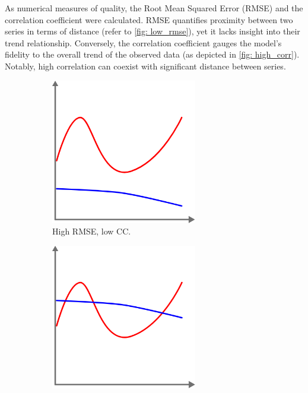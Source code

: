 As numerical measures of quality, the Root Mean Squared Error (RMSE) and the correlation coefficient were calculated.
RMSE quantifies proximity between two series in terms of distance (refer to \autoref*{fig: low_rmse}), yet it lacks insight into their trend relationship.
Conversely, the correlation coefficient gauges the model's fidelity to the overall trend of the observed data (as depicted in \autoref*{fig: high_corr}).
Notably, high correlation can coexist with significant distance between series.

\begin{figure}
    \centering
    \begin{subfigure}{0.3\textwidth}
        \centering
        \includegraphics[width=0.7\textwidth]{resources/images/high_rmse_low_corr.png}
        \caption{High RMSE, low CC.}
        \label{fig: high_rmse_low_corr}
    \end{subfigure}
    \hspace{1.5cm}
    \begin{subfigure}{0.3\textwidth}
        \centering
        \includegraphics[width=0.7\textwidth]{resources/images/low_rmse.png}

\end{subfigure}
\end{figure}
